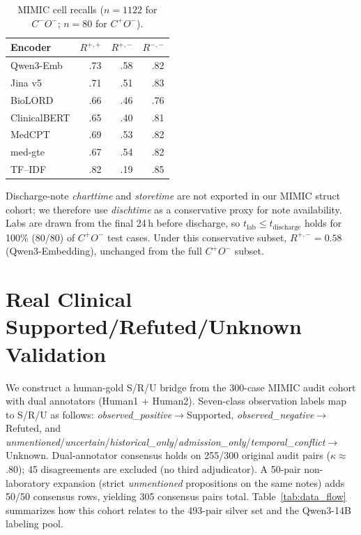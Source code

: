 \documentclass[11pt]{article}
\begin{document}
\begin{table}[!htbp]
  \centering
  \scriptsize
  \renewcommand{\arraystretch}{1.06}
  \caption{MIMIC cell recalls ($n=1122$ for $C^-O^-$; $n=80$ for $C^+O^-$).}
  \label{tab:mimic_cell_recalls}
  \begin{tabular*}{\columnwidth}{@{\extracolsep{\fill}}lrrr@{}}
    \toprule
    \textbf{Encoder} & \textbf{$R^{+,+}$} & \textbf{$R^{+,-}$} &
    \textbf{$R^{-,-}$} \\
    \midrule
    Qwen3-Emb    & .73 & .58 & .82 \\
    Jina v5      & .71 & .51 & .83 \\
    BioLORD      & .66 & .46 & .76 \\
    ClinicalBERT & .65 & .40 & .81 \\
    MedCPT       & .69 & .53 & .82 \\
    med-gte      & .67 & .54 & .82 \\
    TF--IDF      & .82 & .19 & .85 \\
    \bottomrule
  \end{tabular*}
\end{table}

Discharge-note \emph{charttime} and \emph{storetime} are not exported in our
MIMIC struct cohort; we therefore use \emph{dischtime} as a conservative proxy
for note availability. Labs are drawn from the final 24\,h before discharge, so
$t_{\mathrm{lab}}\le t_{\mathrm{discharge}}$ holds for 100\% (80/80) of
$C^+O^-$ test cases. Under this conservative subset,
$R^{+,-}=0.58$ (Qwen3-Embedding), unchanged from the full $C^+O^-$ subset.

\section{Real Clinical Supported/Refuted/Unknown Validation}
\label{app:real_sru}

We construct a human-gold S/R/U bridge from the 300-case MIMIC audit cohort
with dual annotators (Human1 + Human2). Seven-class observation labels map to
S/R/U as follows: \emph{observed\_positive}$\to$Supported,
\emph{observed\_negative}$\to$Refuted, and
\emph{unmentioned}/\emph{uncertain}/\emph{historical\_only}/\emph{admission\_only}/\emph{temporal\_conflict}$\to$Unknown.
Dual-annotator consensus holds on 255/300 original audit pairs
($\kappa\approx$.80); 45 disagreements are excluded (no third adjudicator).
A 50-pair non-laboratory expansion (strict \emph{unmentioned} propositions on
the same notes) adds 50/50 consensus rows, yielding 305 consensus pairs total.
Table~\ref{tab:data_flow} summarizes how this cohort relates to the 493-pair
silver set and the Qwen3-14B labeling pool.
\end{document}

